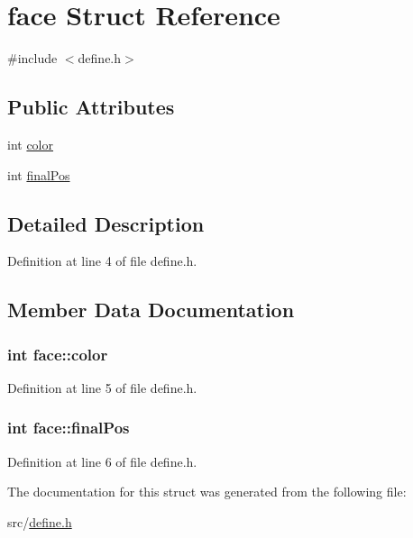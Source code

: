 \hypertarget{structface}{\section{face Struct Reference}
\label{structface}
}


{\ttfamily \#include $<$define.\-h$>$}

\subsection*{Public Attributes}
\begin{DoxyCompactItemize}
\item 
int \hyperlink{structface_a546038f17e765e85d952955473bbc438}{color}
\item 
int \hyperlink{structface_a2cd4a69d43def5ccc0b9f5515c091d5b}{final\-Pos}
\end{DoxyCompactItemize}


\subsection{Detailed Description}


Definition at line 4 of file define.\-h.



\subsection{Member Data Documentation}
\hypertarget{structface_a546038f17e765e85d952955473bbc438}{
\subsubsection[{color}]{\setlength{\rightskip}{0pt plus 5cm}int face\-::color}}\label{structface_a546038f17e765e85d952955473bbc438}


Definition at line 5 of file define.\-h.

\hypertarget{structface_a2cd4a69d43def5ccc0b9f5515c091d5b}{
\subsubsection[{final\-Pos}]{\setlength{\rightskip}{0pt plus 5cm}int face\-::final\-Pos}}\label{structface_a2cd4a69d43def5ccc0b9f5515c091d5b}


Definition at line 6 of file define.\-h.



The documentation for this struct was generated from the following file\-:\begin{DoxyCompactItemize}
\item 
src/\hyperlink{define_8h}{define.\-h}\end{DoxyCompactItemize}
